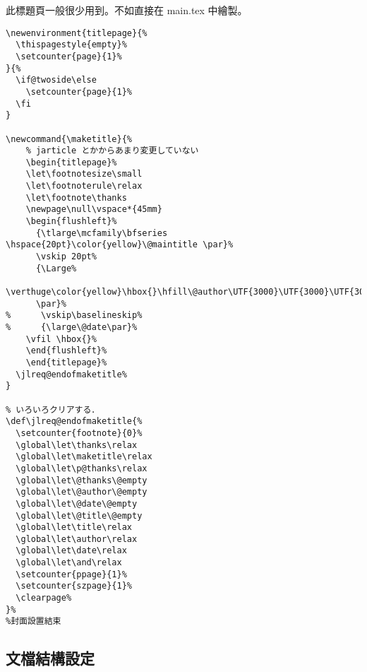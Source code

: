 \par%
此標題頁一般很少用到。不如直接在 main.tex 中繪製。
\begin{lstlisting}[firstnumber=880]
\newenvironment{titlepage}{%
  \thispagestyle{empty}%
  \setcounter{page}{1}%
}{%
  \if@twoside\else
    \setcounter{page}{1}%
  \fi
}

\newcommand{\maketitle}{%
    % jarticle とかからあまり変更していない
    \begin{titlepage}%
    \let\footnotesize\small
    \let\footnoterule\relax
    \let\footnote\thanks
    \newpage\null\vspace*{45mm}
    \begin{flushleft}%
      {\tlarge\mcfamily\bfseries \hspace{20pt}\color{yellow}\@maintitle \par}%
      \vskip 20pt%
      {\Large%
        \verthuge\color{yellow}\hbox{}\hfill\@author\UTF{3000}\UTF{3000}\UTF{3000}%
      \par}%
%      \vskip\baselineskip%
%      {\large\@date\par}%
    \vfil \hbox{}%
    \end{flushleft}%
    \end{titlepage}%
  \jlreq@endofmaketitle%
}

% いろいろクリアする．
\def\jlreq@endofmaketitle{%
  \setcounter{footnote}{0}%
  \global\let\thanks\relax
  \global\let\maketitle\relax
  \global\let\p@thanks\relax
  \global\let\@thanks\@empty
  \global\let\@author\@empty
  \global\let\@date\@empty
  \global\let\@title\@empty
  \global\let\title\relax
  \global\let\author\relax
  \global\let\date\relax
  \global\let\and\relax
  \setcounter{ppage}{1}%
  \setcounter{szpage}{1}%
  \clearpage%
}%
%封面設置結束
\end{lstlisting}

%
\subsection{文檔結構設定}

